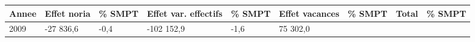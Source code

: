 \begin{longtable}[]{@{}lllllllll@{}}
\toprule
\begin{minipage}[b]{0.05\columnwidth}\raggedright
Annee\strut
\end{minipage} & \begin{minipage}[b]{0.10\columnwidth}\raggedright
Effet noria\strut
\end{minipage} & \begin{minipage}[b]{0.06\columnwidth}\raggedright
\% SMPT\strut
\end{minipage} & \begin{minipage}[b]{0.17\columnwidth}\raggedright
Effet var. effectifs\strut
\end{minipage} & \begin{minipage}[b]{0.06\columnwidth}\raggedright
\% SMPT\strut
\end{minipage} & \begin{minipage}[b]{0.12\columnwidth}\raggedright
Effet vacances\strut
\end{minipage} & \begin{minipage}[b]{0.06\columnwidth}\raggedright
\% SMPT\strut
\end{minipage} & \begin{minipage}[b]{0.08\columnwidth}\raggedright
Total\strut
\end{minipage} & \begin{minipage}[b]{0.06\columnwidth}\raggedright
\% SMPT\strut
\end{minipage}\tabularnewline
\midrule
\endhead
\begin{minipage}[t]{0.05\columnwidth}\raggedright
2009\strut
\end{minipage} & \begin{minipage}[t]{0.10\columnwidth}\raggedright
-27 836,6\strut
\end{minipage} & \begin{minipage}[t]{0.06\columnwidth}\raggedright
-0,4\strut
\end{minipage} & \begin{minipage}[t]{0.17\columnwidth}\raggedright
-102 152,9\strut
\end{minipage} & \begin{minipage}[t]{0.06\columnwidth}\raggedright
-1,6\strut
\end{minipage} & \begin{minipage}[t]{0.12\columnwidth}\raggedright
75 302,0\strut
\end{minipage} & \begin{minipage}[t]{0.06\columnwidth}\raggedright

\end{minipage}
\end{longtable}
